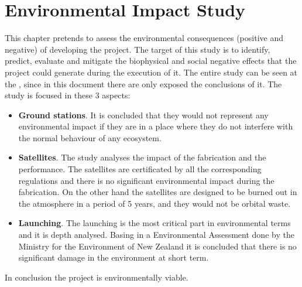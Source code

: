 \chapter{Environmental Impact Study}
This chapter pretends to assess the environmental consequences (positive and negative) of developing the project. The target of this study is to identify, predict, evaluate and mitigate the biophysical and social negative effects that the project could generate during the execution of it. The entire study can be seen at the \cite[Chapter 3]{annex5}, since in this document there are only exposed the conclusions of it.
The study is focused in these 3 aspects:

\begin{itemize}
\item \textbf{Ground stations}. It is concluded that they would not represent any environmental impact if they are in a place where they do not interfere with the normal behaviour of any ecosystem.
\item \textbf{Satellites}. The study analyses the impact of the fabrication and the performance. The satellites are certificated by all the corresponding regulations and there is no significant environmental impact during the fabrication. On the other hand the satellites are designed to be burned out in the atmosphere in a period of 5 years, and they would not be orbital waste.
\item \textbf{Launching}. The launching is the most critical part in environmental terms and it is depth analysed. Basing in a Environmental Assessment done by the Ministry for the Environment of New Zealand \cite{EIS} it is concluded that there is no significant damage in the environment at short term.
\end{itemize}

In conclusion the project is environmentally viable.